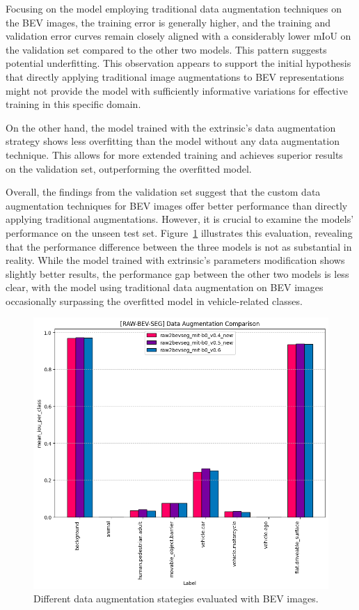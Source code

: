 Focusing on the model employing traditional data augmentation techniques on the BEV images, the training error is generally higher, and the training and validation error curves remain closely aligned with a considerably lower mIoU on the validation set compared to the other two models. This pattern suggests potential underfitting. This observation appears to support the initial hypothesis that directly applying traditional image augmentations to BEV representations might not provide the model with sufficiently informative variations for effective training in this specific domain.

On the other hand, the model trained with the extrinsic's data augmentation strategy shows less overfitting than the model without any data augmentation technique. This allows for more extended training and achieves superior results on the validation set, outperforming the overfitted model. 

Overall, the findings from the validation set suggest that the custom data augmentation techniques for BEV images offer better performance than directly applying traditional augmentations. However, it is crucial to examine the models' performance on the unseen test set. Figure~\ref{fig:bev_before_after_data_aug_test} illustrates this evaluation, revealing that the performance difference between the three models is not as substantial in reality. While the model trained with extrinsic's parameters modification shows slightly better results, the performance gap between the other two models is less clear, with the model using traditional data augmentation on BEV images occasionally surpassing the overfitted model in vehicle-related classes.

\begin{figure}[h!]
    \centering
    \includegraphics[width=0.7\linewidth]{./images/experiments/bev_before_after_data_aug_test.png}
    \caption{Different data augmentation stategies evaluated with BEV images.}
    \label{fig:bev_before_after_data_aug_test}
\end{figure}

